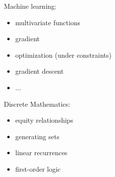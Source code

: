 Machine learning:
\begin{itemize}
    \item multivariate functions
    \item gradient
    \item optimization (under constraints)
    \item gradient descent
    \item ...
\end{itemize}
Discrete Mathematics:
\begin{itemize}
    \item equity relationships
    \item generating sets
    \item linear recurrences
    \item first-order logic
\end{itemize}